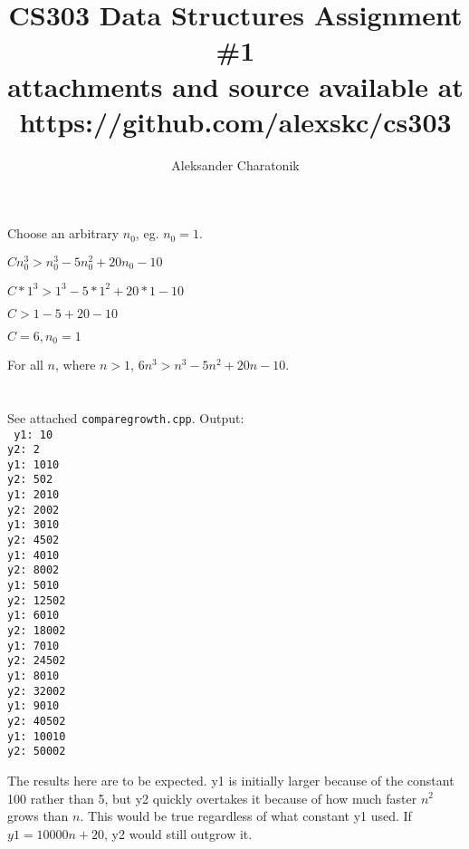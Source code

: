 \documentclass[12pt]{article}
\title{CS303 Data Structures Assignment \#1\\
\large attachments and source available at https://github.com/alexskc/cs303}
\author{Aleksander Charatonik}
\begin{document}
\maketitle

\section{}
{\small
Choose an arbitrary \(n_0\), eg. \(n_0=1\).

\(Cn_0^3>n_0^3-5n_0^2+20n_0-10\)

\(C*1^3>1^3-5*1^2+20*1-10\)

\(C>1-5+20-10\)

\(C=6, n_0=1\)\\
}
For all \(n\), where \(n>1\), \(6n^3>n^3-5n^2+20n-10\).\\

\section{}
See attached \texttt{comparegrowth.cpp}. Output:\\
\texttt{
y1: 10\\
y2: 2\\
y1: 1010\\
y2: 502\\
y1: 2010\\
y2: 2002\\
y1: 3010\\
y2: 4502\\
y1: 4010\\
y2: 8002\\
y1: 5010\\
y2: 12502\\
y1: 6010\\
y2: 18002\\
y1: 7010\\
y2: 24502\\
y1: 8010\\
y2: 32002\\
y1: 9010\\
y2: 40502\\
y1: 10010\\
y2: 50002\\
}

The results here are to be expected. y1 is initially larger because of the constant 100 rather than 5, but y2 quickly overtakes it because of how much faster \(n^2\) grows than \(n\). This would be true regardless of what constant y1 used. If \(y1=10000n +20\), y2 would still outgrow it.\\
\end{document}

